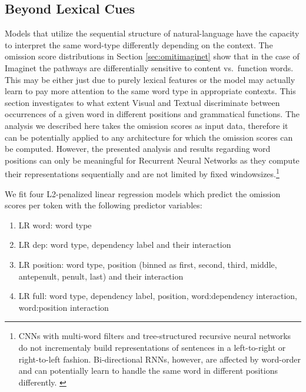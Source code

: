 

\subsection{Beyond Lexical Cues}
\label{sec:beyondlexical}

Models that utilize the sequential structure of natural-language 
have the capacity to interpret the same word-type differently depending on
the context. The omission score distributions in Section \ref{sec:omitimaginet} 
show that in the case of {\sc Imaginet} the 
pathways are differentially sensitive to content vs.\ function
words. This may be either just due to purely lexical features or the model 
may actually learn to pay more attention to the same word type in appropriate
contexts. This section investigates to what extent {\sc Visual} and {\sc Textual}
discriminate between occurrences of a given word in different positions and 
grammatical functions. The analysis we described here takes \label{edit:beyonlexicalgeneral}
the omission scores as input data, therefore it can be potentially applied 
to any architecture for which the omission scores can be computed. However,
the presented analysis and results regarding word positions can only be meaningful
for Recurrent Neural Networks as they compute their representations sequentially and are not
limited by fixed windowsizes.\footnote{CNNs with multi-word filters
and tree-structured recursive neural networks do not incrementaly build representations
of sentences in a left-to-right or right-to-left fashion. 
Bi-directional RNNs, however, are affected by word-order and can potentially
learn to handle the same word in different positions differently. \label{edit:foot}}

We fit four L2-penalized linear regression models which predict the omission 
scores per token with the following predictor variables: 


\begin{enumerate}
	\item {\sc LR word}: word type
	\item {\sc LR dep}: word type, dependency label and their interaction 
	\item {\sc LR position}: word type, position (binned as {\sc first, second, third, middle,
	antepenult, penult, last}) and their interaction
	\item {\sc LR full}: word type, dependency label, position, word:dependency interaction, 
	word:position interaction
\end{enumerate}

